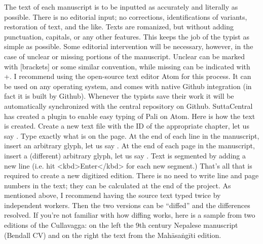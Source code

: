 {}\markdownRendererInterblockSeparator
{}The text of each manuscript is to be inputted as accurately and literally as possible. There is no editorial input; no corrections, identifications of variants, restoration of text, and the like. Texts are romanized, but without adding punctuation, capitals, or any other features. This keeps the job of the typist as simple as possible.\markdownRendererInterblockSeparator
{}Some editorial intervention will be necessary, however, in the case of unclear or missing portions of the manuscript. Unclear  can be marked with [brackets] or some similar convention, while missing  can be indicated with +.\markdownRendererInterblockSeparator
{}I recommend using the open-source text editor Atom for this process. It can be used on any operating system, and comes with native Github integration (in fact it is built by Github). Whenever the typists save their work it will be automatically synchronized with the central repository on Github. SuttaCentral has created a plugin to enable easy typing of Pali on Atom.\markdownRendererInterblockSeparator
{}Here is how the text is created.\markdownRendererInterblockSeparator
{}\markdownRendererOlBegin
{}Create a new text file with the ID of the appropriate chapter, let us say .\markdownRendererOlItemEnd 
{}Type exactly what is on the page.\markdownRendererOlItemEnd 
{}At the end of each line in the manuscript, insert an arbitrary glyph, let us say \markdownRendererCodeSpan{\markdownRendererDollarSign{}}.\markdownRendererOlItemEnd 
{}At the end of each page in the manuscript, insert a (different) arbitrary glyph, let us say \markdownRendererCodeSpan{\markdownRendererHash{}}.\markdownRendererOlItemEnd 
{}Text is segmented by adding a new line (i.e. hit <kbd>Enter</kbd> for each new segment.)\markdownRendererOlItemEnd 
\markdownRendererOlEnd \markdownRendererInterblockSeparator
{}That’s all that is required to create a new digitized edition. There is no need to write line and page numbers in the text; they can be calculated at the end of the project.\markdownRendererInterblockSeparator
{}As mentioned above, I recommend having the source text typed twice by independent workers. Then the two versions can be “diffed” and the differences resolved. If you’re not familiar with how diffing works, here is a sample from two editions of the Culla­vagga: on the left the 9th century Nepalese manuscript (Bendall CV) and on the right the text from the Mahāsaṅgīti edition.\markdownRendererInterblockSeparator
